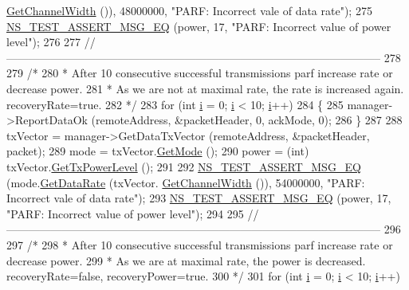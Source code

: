\begin{DoxyCode}
      \hyperlink{classns3_1_1WifiTxVector_a1f8bfa51778a3e217581eb665f059564}{GetChannelWidth} ()), 48000000, \textcolor{stringliteral}{"PARF: Incorrect vale of data rate"});
275   \hyperlink{group__testing_ga2a9d78cffb3db8e867c35fff0b698cf5}{NS\_TEST\_ASSERT\_MSG\_EQ} (power, 17, \textcolor{stringliteral}{"PARF: Incorrect value of power level"});
276 
277   \textcolor{comment}{//-----------------------------------------------------------------------------------------------------}
278 
279   \textcolor{comment}{/*}
280 \textcolor{comment}{   * After 10 consecutive successful transmissions parf increase rate or decrease power.}
281 \textcolor{comment}{   * As we are not at maximal rate, the rate is increased again. recoveryRate=true.}
282 \textcolor{comment}{   */}
283   \textcolor{keywordflow}{for} (\textcolor{keywordtype}{int} \hyperlink{bernuolliDistribution_8m_a6f6ccfcf58b31cb6412107d9d5281426}{i} = 0; \hyperlink{bernuolliDistribution_8m_a6f6ccfcf58b31cb6412107d9d5281426}{i} < 10; \hyperlink{bernuolliDistribution_8m_a6f6ccfcf58b31cb6412107d9d5281426}{i}++)
284     \{
285       manager->ReportDataOk (remoteAddress, &packetHeader, 0, ackMode, 0);
286     \}
287 
288   txVector = manager->GetDataTxVector (remoteAddress, &packetHeader, packet);
289   mode = txVector.\hyperlink{classns3_1_1WifiTxVector_a497b1f11cad4b8b26251dfa07c9ad1d6}{GetMode} ();
290   power = (int) txVector.\hyperlink{classns3_1_1WifiTxVector_a7c98bd9609ff1c5cefa6e22d6908a2fe}{GetTxPowerLevel} ();
291 
292   \hyperlink{group__testing_ga2a9d78cffb3db8e867c35fff0b698cf5}{NS\_TEST\_ASSERT\_MSG\_EQ} (mode.\hyperlink{classns3_1_1WifiMode_adcfbe150f69da720db23387f733b8a52}{GetDataRate} (txVector.
      \hyperlink{classns3_1_1WifiTxVector_a1f8bfa51778a3e217581eb665f059564}{GetChannelWidth} ()), 54000000, \textcolor{stringliteral}{"PARF: Incorrect vale of data rate"});
293   \hyperlink{group__testing_ga2a9d78cffb3db8e867c35fff0b698cf5}{NS\_TEST\_ASSERT\_MSG\_EQ} (power, 17, \textcolor{stringliteral}{"PARF: Incorrect value of power level"});
294 
295   \textcolor{comment}{//-----------------------------------------------------------------------------------------------------}
296 
297   \textcolor{comment}{/*}
298 \textcolor{comment}{   * After 10 consecutive successful transmissions parf increase rate or decrease power.}
299 \textcolor{comment}{   * As we are at maximal rate, the power is decreased. recoveryRate=false, recoveryPower=true.}
300 \textcolor{comment}{   */}
301   \textcolor{keywordflow}{for} (\textcolor{keywordtype}{int} \hyperlink{bernuolliDistribution_8m_a6f6ccfcf58b31cb6412107d9d5281426}{i} = 0; \hyperlink{bernuolliDistribution_8m_a6f6ccfcf58b31cb6412107d9d5281426}{i} < 10; \hyperlink{bernuolliDistribution_8m_a6f6ccfcf58b31cb6412107d9d5281426}{i}++)

\end{DoxyCode}
